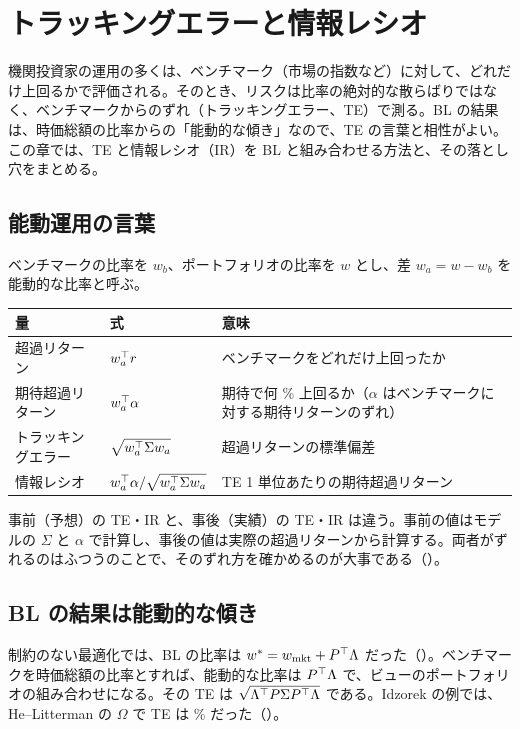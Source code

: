 \chapter{トラッキングエラーと情報レシオ}\label{ch:te}

機関投資家の運用の多くは、ベンチマーク（市場の指数など）に対して、どれだけ上回るかで評価される。そのとき、リスクは比率の絶対的な散らばりではなく、ベンチマークからのずれ（トラッキングエラー、TE）で測る。BL の結果は、時価総額の比率からの「能動的な傾き」なので、TE の言葉と相性がよい。この章では、TE と情報レシオ（IR）を BL と組み合わせる方法と、その落とし穴をまとめる。

\section{能動運用の言葉}

ベンチマークの比率を $w_b$、ポートフォリオの比率を $w$ とし、差 $w_a=w-w_b$ を能動的な比率と呼ぶ。

\begin{center}
\small
\begin{tabular}{p{2.8cm}p{4.2cm}p{6.0cm}}
\toprule
量 & 式 & 意味 \\
\midrule
超過リターン & $w_a^{\top} r$ & ベンチマークをどれだけ上回ったか \\
期待超過リターン & $w_a^{\top}\alpha$ & 期待で何 \% 上回るか（$\alpha$ はベンチマークに対する期待リターンのずれ） \\
トラッキングエラー & $\sqrt{w_a^{\top}\Sigma w_a}$ & 超過リターンの標準偏差 \\
情報レシオ & $w_a^{\top}\alpha/\sqrt{w_a^{\top}\Sigma w_a}$ & TE 1 単位あたりの期待超過リターン \\
\bottomrule
\end{tabular}
\end{center}

事前（予想）の TE・IR と、事後（実績）の TE・IR は違う。事前の値はモデルの $\Sigma$ と $\alpha$ で計算し、事後の値は実際の超過リターンから計算する。両者がずれるのはふつうのことで、そのずれ方を確かめるのが大事である（）。

\section{BL の結果は能動的な傾き}

制約のない最適化では、BL の比率は $w^*=w_{\mathrm{mkt}}+P^{\top}\Lambda$ だった（）。ベンチマークを時価総額の比率とすれば、能動的な比率は $P^{\top}\Lambda$ で、ビューのポートフォリオの組み合わせになる。その TE は $\sqrt{\Lambda^{\top} P\Sigma P^{\top}\Lambda}$ である。Idzorek の例では、He--Litterman の $\Omega$ で TE は \% だった（）。

